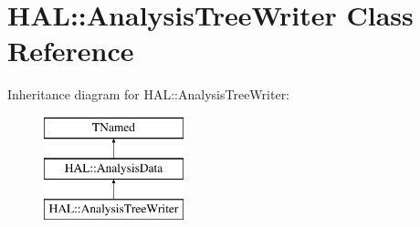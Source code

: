 \hypertarget{class_h_a_l_1_1_analysis_tree_writer}{\section{H\-A\-L\-:\-:Analysis\-Tree\-Writer Class Reference}
\label{class_h_a_l_1_1_analysis_tree_writer}
}
Inheritance diagram for H\-A\-L\-:\-:Analysis\-Tree\-Writer\-:\begin{figure}[H]
\begin{center}
\leavevmode
\includegraphics[height=3.000000cm]{class_h_a_l_1_1_analysis_tree_writer}
\end{center}
\end{figure}
